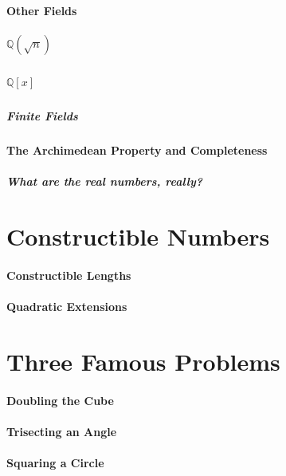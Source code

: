 \documentclass[11pt]{article}
\theoremstyle{definition}
\begin{document}
\subsection{Other Fields}

\subsubsection{$\mathbb{Q}(\sqrt{n})$}

\subsubsection{$\mathbb{Q}[x]$}

\subsubsection{Finite Fields}

\subsection{The Archimedean Property and Completeness}

\subsubsection{What are the real numbers, really?}

\part{Constructible Numbers}

\subsection{Constructible Lengths}

\subsection{Quadratic Extensions}


\part{Three Famous Problems}

\subsection{Doubling the Cube}

\subsection{Trisecting an Angle}

\subsection{Squaring a Circle}
\end{document}
